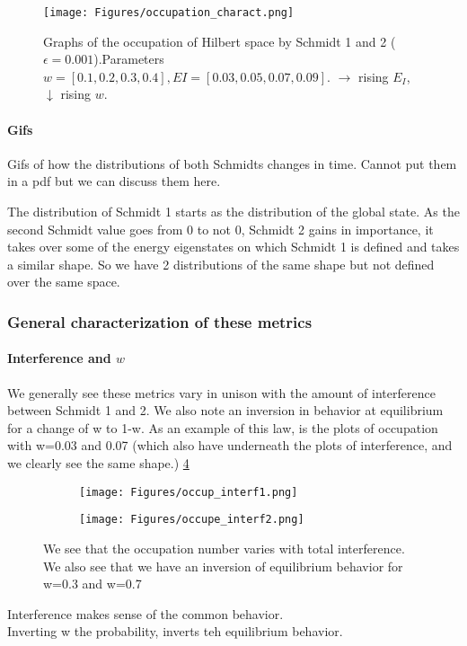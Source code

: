 \documentclass{article}
\begin{document}
\begin{figure}[h]
    \centering
    \texttt{[image: Figures/occupation\_charact.png]}
    \caption{Graphs of the occupation of Hilbert space by Schmidt 1 and 2 ($\epsilon=0.001$).Parameters $w=[0.1,0.2,0.3,0.4], EI=[0.03,0.05,0.07,0.09]$. $\rightarrow$ rising $E_I$, $\downarrow$ rising $w$.}
    \label{fig:characteriazation_occupation}
\end{figure}

\paragraph{Gifs}
Gifs of how the distributions of both Schmidts changes in time. Cannot put them in a pdf but we can discuss them here.

The distribution of Schmidt 1 starts as the distribution of the global state. As the second Schmidt value goes from 0 to not 0, Schmidt 2 gains in importance, it takes over some of the energy eigenstates on which Schmidt 1 is defined and takes a similar shape. So we have 2 distributions of the same shape but not defined over the same space.

\subsubsection{General characterization of these metrics}

\paragraph{Interference and $w$}
We generally see these metrics vary in unison with the amount of interference between Schmidt 1 and 2. We also note an inversion in behavior at equilibrium for a change of w to 1-w. As an example of this law, is the plots of occupation with w=0.03 and 0.07 (which also have underneath the plots of interference, and we clearly see the same shape.) \ref{fig:Occup_interf}

\begin{figure}[h!]
  \centering
  \begin{subfigure}[b]{0.4\linewidth}
    \texttt{[image: Figures/occup\_interf1.png]}
    \label{fig:1}
  \end{subfigure}
  \begin{subfigure}[b]{0.4\linewidth}
    \texttt{[image: Figures/occupe\_interf2.png]}
    \label{fig:2}
  \end{subfigure}
  \caption{We see that the occupation number varies with total interference. We also see that we have an inversion of equilibrium behavior for w=0.3 and w=0.7}
  \label{fig:Occup_interf}
\end{figure}
{\color{teal} Interference makes sense of the common behavior.}\\
{\color{teal} Inverting w the probability, inverts teh equilibrium behavior. }
\end{document}
